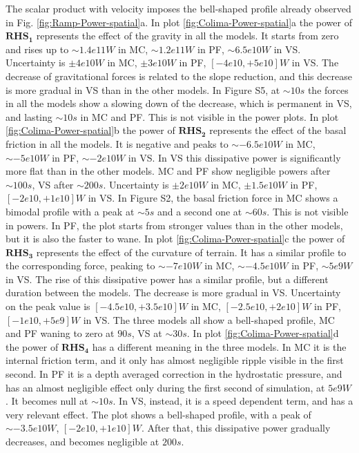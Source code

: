 \documentclass{article}
\begin{document}
The scalar product with velocity imposes the bell-shaped profile already observed in Fig. \ref{fig:Ramp-Power-spatial}a. In plot \ref{fig:Colima-Power-spatial}a the power of $\boldsymbol{RHS_1}$ represents the effect of the gravity in all the models. It starts from zero and rises up to $\sim 1.4e11 W$ in MC, $\sim 1.2e11 W$ in PF, $\sim 6.5e10 W$ in VS. Uncertainty is $\pm 4e10 W$ in MC, $\pm 3e10 W$ in PF, $[-4e10,+5e10] W$ in VS. The decrease of gravitational forces is related to the slope reduction, and this decrease is more gradual in VS than in the other models. In Figure S5, at $\sim 10 s$ the forces in all the models show a slowing down of the decrease, which is permanent in VS, and lasting $\sim 10 s$ in MC and PF. This is not visible in the power plots. In plot \ref{fig:Colima-Power-spatial}b the power of  $\boldsymbol{RHS_2}$ represents the effect of the basal friction in all the models. It is negative and peaks to $\sim -6.5e10 W$ in MC, $\sim -5e10 W$ in PF, $\sim -2e10 W$ in VS. In VS this dissipative power is significantly more flat than in the other models. MC and PF show negligible powers after $\sim 100 s$, VS after $\sim 200 s$. Uncertainty is $\pm 2e10 W$ in MC, $\pm 1.5e10 W$ in PF, $[-2e10,+1e10] W$ in VS. In Figure S2, the basal friction force in MC shows a bimodal profile with a peak at $\sim 5 s$ and a second one at $\sim 60 s$. This is not visible in powers. In PF, the plot starts from stronger values than in the other models, but it is also the faster to wane. In plot \ref{fig:Colima-Power-spatial}c the power of $\boldsymbol{RHS_3}$ represents the effect of the curvature of terrain. It has a similar profile to the corresponding force, peaking to $\sim -7e10 W$ in MC, $\sim -4.5e10 W$ in PF, $\sim 5e9 W$ in VS. The rise of this dissipative power has a similar profile, but a different duration between the models. The decrease is more gradual in VS. Uncertainty on the peak value is $[-4.5e10,+3.5e10] W$ in MC, $[-2.5e10,+2e10] W$ in PF, $[-1e10,+5e9] W$ in VS. The three models all show a bell-shaped profile, MC and PF waning to zero at $90 s$, VS at $\sim 30 s$. In plot \ref{fig:Colima-Power-spatial}d the power of $\boldsymbol{RHS_4}$ has a different meaning in the three models. In MC it is the internal friction term, and it only has almost negligible ripple visible in the first second. In PF it is a depth averaged correction in the hydrostatic pressure, and has an almost negligible effect only during the first second of simulation, at $5e9 W$. It becomes null at $\sim 10 s$. In VS, instead, it is a speed dependent term, and has a very relevant effect. The plot shows a bell-shaped profile, with a peak of $\sim -3.5e10 W$, $[-2e10,+1e10] W$. After that, this dissipative power gradually decreases, and becomes negligible at $200 s$. 
\end{document}
